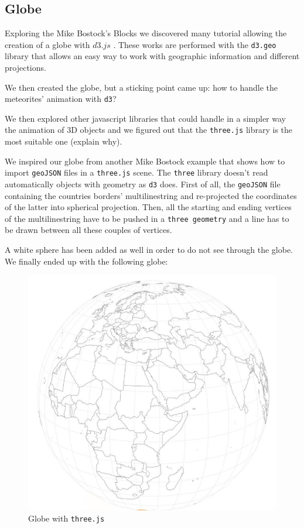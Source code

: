 \documentclass[10pt,conference,compsocconf]{IEEEtran}
\begin{document}
\subsection{Globe}
Exploring the Mike Bostock's Blocks \cite{bostock_mike_nodate} we discovered many tutorial allowing the creation of a globe with $d3.js$ \cite{bostock_see-through_nodate,bostock_globe_nodate}.  These works are performed with the \texttt{d3.geo} library that allows an easy way to work with geographic information and different projections.

We then created the globe, but a sticking point came up: how to handle the meteorites' animation with \texttt{d3}?

We then explored other javascript libraries that could handle in a simpler way the animation of 3D objects and we figured out that the \texttt{three.js} library \cite{BibEntry2017Nov} is the most suitable one (explain why).

We inspired our globe from another Mike Bostock example \cite{BibEntry2017Aug} that shows how to import \texttt{geoJSON} files in a \texttt{three.js} scene. The \texttt{three} library doesn't read automatically objects with geometry as \texttt{d3} does. First of all, the \texttt{geoJSON} file containing the countries borders' multilinestring \cite{countryfile} and re-projected the coordinates of the latter into spherical projection. Then, all the starting and ending vertices of the multilinestring have to be pushed in a \texttt{three geometry} and a line has to be drawn between all these couples of vertices.



A white sphere has been added as well in order to do not see through the globe.
We finally ended up with the following globe:
\begin{figure}[h]
  \centering
  \includegraphics[width=\columnwidth]{images/globe.jpg}
  \vspace{-3mm}
  \caption{Globe with \texttt{three.js}}
  \label{fig:globe}
\end{figure}
\end{document}

